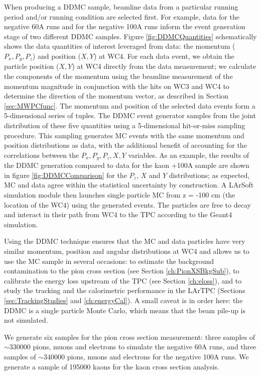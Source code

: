 When producing a DDMC sample, beamline data from a particular running period and/or running condition are selected first. For example, data for the negative 60A runs and for the negative 100A runs inform the event generation stage of two different DDMC samples. Figure \ref{fig:DDMCQuantities}  schematically shows the data quantities of interest leveraged from data: the momentum ($P_x, P_y, P_z$) and position ($X, Y$) at WC4. For each data event, we obtain the  particle position ($X, Y$) at WC4 directly from the data measurement; we calculate the components of the momentum using the beamline measurement of the momentum magnitude in conjunction with the hits on WC3 and WC4 to determine the direction of the momentum vector, as described in Section \ref{sec:MWPCfunc}. The momentum and position of the selected data events form a 5-dimensional series of tuples.  The DDMC event generator samples from the joint distribution of these five quantities using a 5-dimensional hit-or-miss sampling procedure. This sampling generates MC events  with the same momentum and position distributions as data, with the additional benefit of accounting for the correlations between the $P_x, P_y, P_z, X, Y$ variables.  As an example, the results of the DDMC generation compared to data for the kaon +100A sample are shown in figure \ref{fig:DDMCComparison} for the $P_z$, $X$ and $Y$ distributions; as expected, MC and data agree within the statistical uncertainty by construction. A LArSoft simulation module then launches single particle MC from z = -100 cm (the location of the WC4) using the generated events. The particles are free to decay and interact in their path from WC4 to the TPC according to the Geant4 simulation.

Using the DDMC technique ensures that the MC and data particles have very similar momentum, position and angular distributions at WC4 and allows us to use the MC sample in several occasions: to estimate the background contamination to the pion cross section (see Section \ref{ch:PionXSBkgSub}), to calibrate the energy loss upstream of the TPC (see Section \ref{ch:eloss}),  and to study the tracking and the calorimetric performance  in the LArTPC (Sections \ref{sec:TrackingStudies} and \ref{ch:energyCal}). A small caveat is in order here: the DDMC is a single particle Monte Carlo, which means that the beam pile-up is not simulated. 


We generate six samples for the pion cross section measurement: three samples of  $\sim$330000 pions, muons and electrons to simulate the negative 60A runs, and three samples of $\sim$340000 pions, muons and electrons for the negative 100A runs. We generate a sample of  195000  kaons for the kaon cross section analysis.

